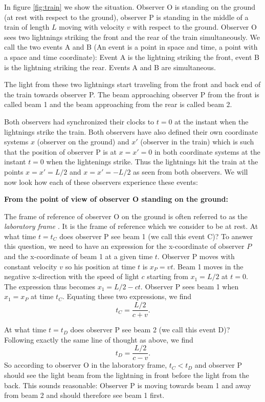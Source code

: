 {\begin{multicols}{2}
In figure \ref{fig:train} we show the situation. Observer O is standing on the ground (at rest with respect to the ground), observer P is standing in the middle of a train of length $L$ moving with velocity $v$ with respect to the ground. Observer O sees two lightnings striking the front and the rear of the train simultaneously. We call the two events A and B (An event is a point in space and time, a point with a space and time coordinate): Event A is the lightning striking the front, event B is the lightning striking the rear. Events A and B are simultaneous. 

The light from these two lightnings start traveling from the front and back end of the train towards observer P. The beam approaching observer P from the front is called beam 1 and the beam approaching from the rear is called beam 2. 

Both observers had synchronized their clocks to $t=0$ at the instant when the lightnings strike the train. Both observers have also defined their own coordinate systems $x$ (observer on the ground) and $x'$ (observer in the train) which is such that the position of observer P is at $x=x'=0$ in both coordinate systems at the instant $t=0$ when the lightenings strike. Thus the lightnings hit the train at the points $x=x'=L/2$ and $x=x'=-L/2$ as seen from both observers. We will now look how each of these observers experience these events:

{\bf From the point of view of observer O standing on the ground:}

The frame of reference of observer O on the ground is often referred to as the {\it laboratory frame \label{pg:labframe}}. It is the frame of reference which we consider to be at rest. At what time $t=t_C$ does observer P see beam 1 (we call this event C)? To answer this question, we need to have an expression for the x-coordinate of observer $P$ and the x-coordinate of beam 1 at a given time $t$. Observer P moves with constant velocity $v$ so his position at time $t$ is $x_P=vt$. Beam 1 moves in the negative x-direction with the speed of light $c$ starting from $x_1=L/2$ at $t=0$. The expression thus becomes $x_1=L/2-ct$. Observer P sees beam 1 when $x_1=x_P$ at time $t_C$. Equating these two expressions, we find
\begin{equation}
\label{eq:tc}
t_C=\frac{L/2}{c+v}.
\end{equation}

At what time $t=t_D$ does observer P see beam 2 (we call this event D)? Following exactly the same line of thought as above, we find
\begin{equation}
\label{eq:td}
t_D=\frac{L/2}{c-v}.
\end{equation}
So according to observer O in the laboratory frame, $t_C<t_D$ and observer P should see the light beam from the lightning in front before the light from the back. This sounds reasonable: Observer P is moving towards beam 1 and away from beam 2 and should therefore see beam 1 first.


\end{multicols}}
